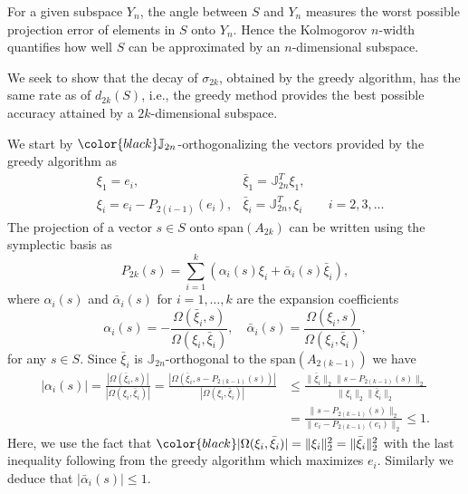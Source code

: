 \documentclass[final]{siamart}
\begin{document}
For a given subspace $Y_n$, the angle between $S$ and $Y_n$ measures the worst possible projection error of elements in $S$ onto $Y_n$. Hence the Kolmogorov $n$-width quantifies how well $S$ can be approximated by {{\color{black}} an} $n$-dimensional subspace. 

We seek to show that the decay of $\sigma_{2k}$, obtained by the greedy algorithm, has the same rate as of $d_{2k}(S)$, i.e., the greedy method provides the best possible accuracy attained by a $2k$-dimensional subspace.

We start by ${\color{black}} \mathbb J_{2n}$-orthogonalizing the vectors provided by the greedy algorithm as
\begin{equation} \label{eq:new6}
\begin{aligned}
	& \xi_1 = e_i, & \bar{\xi}_1 = \mathbb{J}_{2n}^T \xi_1, &\\
	& \xi_i = e_i - P_{2(i-1)} (e_i), & \bar{\xi}_i = \mathbb{J}_{2n}^T, \xi_i &\quad i = 2,3,\dots
\end{aligned}
\end{equation}
The projection of a vector $s\in S$ onto span$(A_{2k})$ can be written using the symplectic basis as
\begin{equation} \label{eq:new7}
	P_{2k}(s) = \sum_{i=1}^k \left( \alpha_i(s) \xi_i + \bar{\alpha}_i(s) \bar{\xi}_i \right),
\end{equation}
where $\alpha_i(s)$ and $\bar{\alpha}_i(s)$ for $i=1,\dots,k$ are the expansion coefficients
\begin{equation} \label{eq:new8}
	\alpha_i(s) = - \frac{\Omega(\bar{\xi}_i,s)}{\Omega(\xi_i,\bar{\xi}_i)}, \quad \bar{\alpha}_i(s) = \frac{\Omega(\xi_i,s)}{\Omega(\xi_i,\bar{\xi}_i)},
\end{equation}
for any $s\in S$. Since $\bar{\xi}_i$ is {{\color{black}} $\mathbb J_{2n}$-orthogonal} to the span$(A_{2(k-1)})$ we have
\begin{equation} \label{eq:new9}
\begin{aligned}
	|\alpha_i(s)| = \frac{|\Omega(\bar{\xi}_i,s)|}{|\Omega(\xi_i,\bar{\xi}_i)|} = \frac{|\Omega( \bar{\xi}_i, s - P_{2(k-1)}(s))|}{|\Omega(\xi_i,\bar{\xi}_i)|}  &\leq \frac{\|\bar{\xi}_i\|_2 \| s - P_{2(k-1)}(s) \|_2}{ \|\xi_i\|_2 \|\bar{\xi}_i\|_2 } \\
	&= \frac{\| s - P_{2(k-1)}(s) \|_2}{\| e_i - P_{2(k-1)}(e_i) \|_2} \leq 1.
\end{aligned}
\end{equation}
Here, we use the fact that ${\color{black}} |\Omega(\xi_i,\bar{\xi}_i)| = \| \xi_i \|^2_2 = \|\bar{\xi}_i\|^2_2$ with the last inequality following from the greedy algorithm which maximizes $e_i$. Similarly we deduce that $|\bar{\alpha}_i(s)|\leq 1$.
\end{document}
